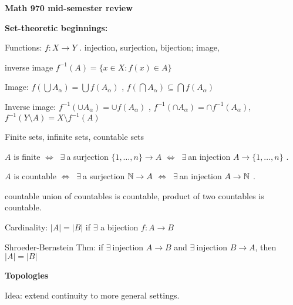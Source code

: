 
\UseAMSsymbols


\def\ctln{\centerline}
\def\ni{\noindent}
\def\ssk{\smallskip}
\def\msk{\medskip}
\def\bsk{\bigskip}
\def\ra{\rightarrow}
\def\itt{\item}
\def\pr{\hskip-10pt}
\def\hsk{\hskip10pt}
\def\hhsk{\hskip20pt}
\def\lra{$\Leftrightarrow\ $ }
\def\exs{$\exists\ $}
\def\foa{$\forall\ $}
\def\cau{{\Cal U} }
\def\cav{{\Cal V}}
\def\sset{\subseteq}
\def\finv{f^{-1}}
\def\catm{${\Cal T}\ $}
\def\cat{{\Cal T}}
\def\catpm{$\cat^\prime\ $}
\def\catp{\cat^\prime}
\def\top{topology}
\def\tops{topologies}
\def\cts{continuous}
\def\smin{\setminus}
\def\cab{{\Cal B}}
\def\cabm{${\Cal B}\ $}
\def\cas{{\Cal S}}
\def\casm{${\Cal S}\ $}
\def\bbbr{{\Bbb R}}
\def\bbbn{{\Bbb N}}
\def\bbbq{{\Bbb Q}}


\ctln{\bf Math 970 mid-semester review}

\bsk

\pr {\bf Set-theoretic beginnings:}

Functions: $f:X\ra Y$ .  injection, surjection, bijection; image, 

inverse image $f^{-1}(A) = \{x\in X : f(x)\in A\}$

\pr Image: $f(\bigcup A_\alpha) = \bigcup f(A_\alpha)$ , 
$f(\bigcap A_\alpha) \subseteq \bigcap f(A_\alpha)$

\pr Inverse image: $f^{-1}(\cup A_\alpha) = \cup f(A_\alpha)$ , $f^{-1}(\cap A_\alpha) = \cap f^{-1}(A_\alpha)$, 
$f^{-1}(Y\setminus A) = X\setminus f^{-1}(A)$

Finite sets, infinite sets, countable sets

\hsk $A$ is finite \lra \exs a surjection $\{1,\ldots , n\}\rightarrow A$ \lra \exs an injection $A \rightarrow \{1,\ldots , n\}$ .

\hsk $A$ is countable \lra \exs a surjection ${\Bbb N}\rightarrow A$ \lra \exs an injection $A \rightarrow {\Bbb N}$ .

\hsk countable union of countables is countable, product of two countables is countable.

Cardinality: $|A|=|B|$ if $\exists$ a bijection $f:A\ra B$

Shroeder-Bernstein Thm: if \exs injection $A\ra B$ and \exs injection $B\ra A$, then $|A|=|B|$

\msk

\pr {\bf Topologies}

Idea: extend continuity to more general settings. 

